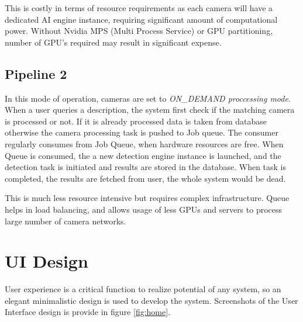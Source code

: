 This is costly in terms of resource requirements as each camera will have a dedicated AI engine instance, requiring significant amount of computational power. Without Nvidia MPS (Multi Process Service) or GPU partitioning, number of GPU's required may result in significant expense.

\subsection*{Pipeline 2}
In this mode of operation, cameras are set to \textit{ON\_DEMAND proccessing mode}. When a user queries a description, the system first check if the matching camera is processed or not. If it is already processed data is taken from database otherwise the camera processing task is pushed to Job queue. The consumer regularly consumes from Job Queue, when hardware resources are free. When Queue is consumed, the a new detection engine instance is launched, and the detection task is initiated and results are stored in the database. When task is completed, the results are fetched from user, the whole system would be dead.

This is much less resource intensive but requires complex infrastructure. Queue helps in load balancing, and allows usage of less GPUs and servers to process large number of camera networks.





\section{UI Design}
User experience is a critical function to realize potential of any system, so an elegant minimalistic design is used to develop the system. Screenshots of the User Interface design is provide in figure \ref{fig:home}.

